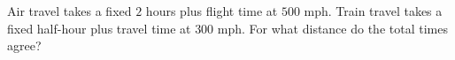 Air travel takes a fixed $2$ hours plus flight time at $500$ mph. Train travel takes a fixed half-hour plus travel time at $300$ mph. For what distance do the total times agree?
